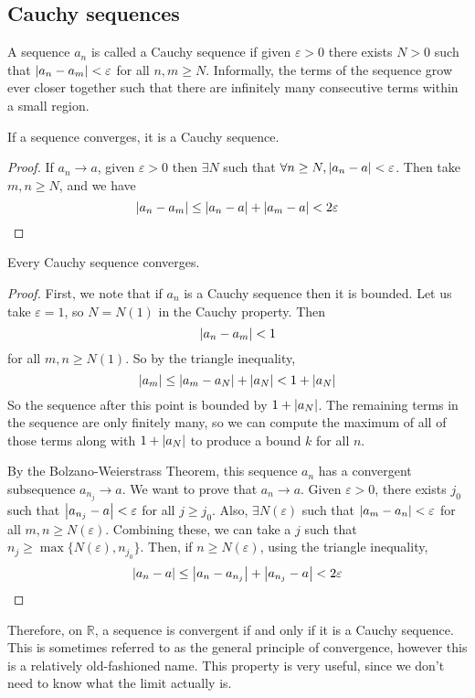 \subsection{Cauchy sequences}
\begin{definition}
	A sequence \(a_n\) is called a Cauchy sequence if given \(\varepsilon > 0\) there exists \(N > 0\) such that \(\abs{a_n - a_m} < \varepsilon\) for all \(n, m \geq N\).
	Informally, the terms of the sequence grow ever closer together such that there are infinitely many consecutive terms within a small region.
\end{definition}
\begin{lemma}
	If a sequence converges, it is a Cauchy sequence.
\end{lemma}
\begin{proof}
	If \(a_n \to a\), given \(\varepsilon > 0\) then \(\exists N\) such that \(\forall n \geq N, \abs{a_n - a} < \varepsilon\).
	Then take \(m, n \geq N\), and we have
	\[
		\abs{a_n - a_m} \leq \abs{a_n - a} + \abs{a_m - a} < 2\varepsilon
	\]
\end{proof}
\begin{theorem}
	Every Cauchy sequence converges.
\end{theorem}
\begin{proof}
	First, we note that if \(a_n\) is a Cauchy sequence then it is bounded.
	Let us take \(\varepsilon = 1\), so \(N = N(1)\) in the Cauchy property.
	Then
	\[
		\abs{a_n - a_m} < 1
	\]
	for all \(m, n \geq N(1)\).
	So by the triangle inequality,
	\[
		\abs{a_m} \leq \abs{a_m - a_N} + \abs{a_N} < 1 + \abs{a_N}
	\]
	So the sequence after this point is bounded by \(1 + \abs{a_N}\).
	The remaining terms in the sequence are only finitely many, so we can compute the maximum of all of those terms along with \(1+\abs{a_N}\) to produce a bound \(k\) for all \(n\).

	By the Bolzano-Weierstrass Theorem, this sequence \(a_n\) has a convergent subsequence \(a_{n_j} \to a\).
	We want to prove that \(a_n \to a\).
	Given \(\varepsilon > 0\), there exists \(j_0\) such that \(\abs{a_{n_j} - a} < \varepsilon\) for all \(j \geq j_0\).
	Also, \(\exists N(\varepsilon)\) such that \(\abs{a_m - a_n} < \varepsilon\) for all \(m, n \geq N(\varepsilon)\).
	Combining these, we can take a \(j\) such that \(n_j \geq \max \{ N(\varepsilon), n_{j_0} \}\).
	Then, if \(n \geq N(\varepsilon)\), using the triangle inequality,
	\[
		\abs{a_n - a} \leq \abs{a_n - a_{n_j}} + \abs{a_{n_j} - a} < 2\varepsilon
	\]
\end{proof}
\noindent Therefore, on \(\mathbb R\), a sequence is convergent if and only if it is a Cauchy sequence.
This is sometimes referred to as the general principle of convergence, however this is a relatively old-fashioned name.
This property is very useful, since we don't need to know what the limit actually is.
